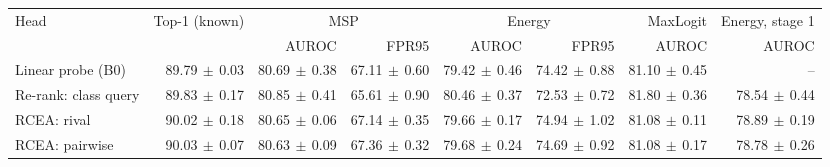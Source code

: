\begin{tabular}{lrrrrrrr}
\toprule
Head & Top-1 (known) & \multicolumn{2}{c}{MSP} & \multicolumn{2}{c}{Energy} & MaxLogit & Energy, stage 1 \\
 & & AUROC & FPR95 & AUROC & FPR95 & AUROC & AUROC \\
\midrule
Linear probe (B0) & 89.79{\scriptsize$\,\pm\,$0.03} & 80.69{\scriptsize$\,\pm\,$0.38} & 67.11{\scriptsize$\,\pm\,$0.60} & 79.42{\scriptsize$\,\pm\,$0.46} & 74.42{\scriptsize$\,\pm\,$0.88} & 81.10{\scriptsize$\,\pm\,$0.45} & -- \\
Re-rank: class query & 89.83{\scriptsize$\,\pm\,$0.17} & 80.85{\scriptsize$\,\pm\,$0.41} & 65.61{\scriptsize$\,\pm\,$0.90} & 80.46{\scriptsize$\,\pm\,$0.37} & 72.53{\scriptsize$\,\pm\,$0.72} & 81.80{\scriptsize$\,\pm\,$0.36} & 78.54{\scriptsize$\,\pm\,$0.44} \\
RCEA: rival & 90.02{\scriptsize$\,\pm\,$0.18} & 80.65{\scriptsize$\,\pm\,$0.06} & 67.14{\scriptsize$\,\pm\,$0.35} & 79.66{\scriptsize$\,\pm\,$0.17} & 74.94{\scriptsize$\,\pm\,$1.02} & 81.08{\scriptsize$\,\pm\,$0.11} & 78.89{\scriptsize$\,\pm\,$0.19} \\
RCEA: pairwise & 90.03{\scriptsize$\,\pm\,$0.07} & 80.63{\scriptsize$\,\pm\,$0.09} & 67.36{\scriptsize$\,\pm\,$0.32} & 79.68{\scriptsize$\,\pm\,$0.24} & 74.69{\scriptsize$\,\pm\,$0.92} & 81.08{\scriptsize$\,\pm\,$0.17} & 78.78{\scriptsize$\,\pm\,$0.26} \\
\bottomrule
\end{tabular}
